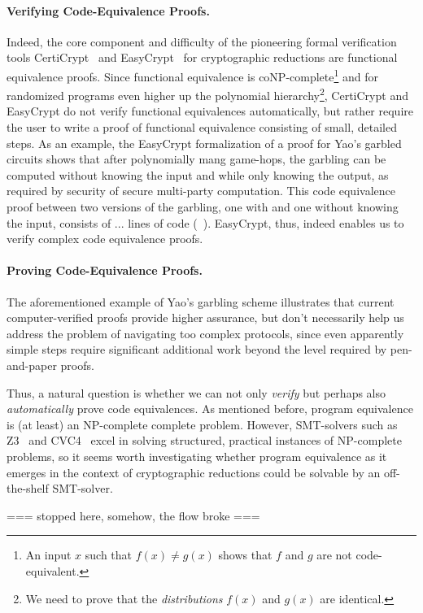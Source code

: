 \paragraph{Verifying Code-Equivalence Proofs.}
Indeed, the core component and difficulty of the pioneering formal
verification tools CertiCrypt~\cite{X} and EasyCrypt~\cite{X} for 
cryptographic reductions are functional equivalence proofs. Since functional 
equivalence is coNP-complete\footnote{An input $x$ such that 
$f(x)\neq g(x)$ shows that $f$ and $g$ are not code-equivalent.} and 
for randomized programs even higher up the polynomial hierarchy\footnote{We need to prove that the \emph{distributions} $f(x)$ and $g(x)$ are identical.}, 
CertiCrypt and EasyCrypt do not verify functional equivalences automatically,
but rather require the user to write a proof of functional equivalence
consisting of small, detailed steps. As an example, the EasyCrypt formalization
of a proof for Yao's garbled circuits shows that after polynomially mang game-hops, the garbling can be computed without knowing the input and while only knowing the output, as required by security of secure multi-party computation. This code equivalence proof between two versions of the garbling, one with and one without
knowing the input, consists of ... lines of code (~\cite[page x]{}). EasyCrypt,
 thus, indeed enables us to verify complex code equivalence proofs.

\paragraph{Proving Code-Equivalence Proofs.}
The aforementioned example of Yao's garbling scheme illustrates that current
computer-verified proofs provide higher assurance, but don't necessarily
help us address the problem of navigating too complex protocols,
since even apparently simple steps require significant additional work
beyond the level required by pen-and-paper proofs. 

Thus, a natural question is whether we can not only \emph{verify} but
perhaps also \emph{automatically} prove code equivalences. As mentioned
before, program equivalence is (at least) an NP-complete complete problem.
However, SMT-solvers such as Z3~\cite{X} and CVC4~\cite{X} excel in 
solving structured, practical instances of NP-complete problems, so it
seems worth investigating whether program equivalence as it emerges in
the context of cryptographic reductions could be solvable by an off-the-shelf
SMT-solver.

=== stopped here, somehow, the flow broke ===





